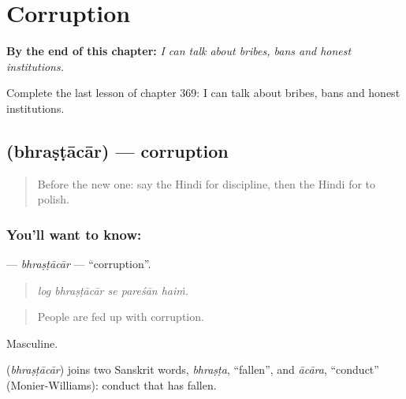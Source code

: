
\chapter{Corruption}
\label{ch:hi-corruption}

\begin{chapteropening}
\textbf{By the end of this chapter:} \emph{I can talk about bribes, bans and honest institutions.}

Complete the last lesson of chapter 369: I can talk about bribes, bans and honest institutions.
\end{chapteropening}

\section[\texorpdfstring{\hi{भ्रष्टाचार} (bhraṣṭācār)}{भ्रष्टाचार (bhraṣṭācār)}]{ (bhraṣṭācār) — corruption}

\label{lesson:HI-C369-bhrastacar}



\begin{quote}
Before the new one: say the Hindi for discipline, then the Hindi for to polish.
\end{quote}

\subsection*{You'll want to know: }
\textbf{} — \emph{bhraṣṭācār} — \textquotedblleft{}corruption\textquotedblright{}.

\begin{quote}
    
\end{quote}

\begin{quote}
\emph{log bhraṣṭācār se pareśān haiṁ.}
\end{quote}

\begin{quote}
People are fed up with corruption.
\end{quote}

Masculine.

\begin{cousinweb}
\textbf{} (\emph{bhraṣṭācār}) joins two Sanskrit words, \emph{bhraṣṭa}, \textquotedblleft{}fallen\textquotedblright{}, and \emph{ācāra}, \textquotedblleft{}conduct\textquotedblright{} (Monier-Williams): conduct that has fallen.
\end{cousinweb}

